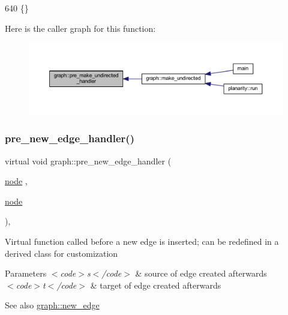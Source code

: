 \begin{DoxyCode}
640 \{\}
\end{DoxyCode}
Here is the caller graph for this function\+:
\nopagebreak
\begin{figure}[H]
\begin{center}
\leavevmode
\includegraphics[width=350pt]{classgraph_a8964107991e6f411ba8992f6b1deda21_icgraph}
\end{center}
\end{figure}
\mbox{\label{classgraph_a0a7a68fa0baa47ef955525c445fa1a04}} 
\subsubsection{\texorpdfstring{pre\+\_\+new\+\_\+edge\+\_\+handler()}{pre\_new\_edge\_handler()}}
{\footnotesize\ttfamily virtual void graph\+::pre\+\_\+new\+\_\+edge\+\_\+handler (\begin{DoxyParamCaption}\item[{\mbox{\hyperlink{classnode}{node}}}]{,  }\item[{\mbox{\hyperlink{classnode}{node}}}]{ }\end{DoxyParamCaption})\hspace{0.3cm}{\ttfamily [inline]}, {\ttfamily [virtual]}}

Virtual function called before a new edge is inserted; can be redefined in a derived class for customization


\begin{DoxyParams}{Parameters}
{\em $<$code$>$s$<$/code$>$} & source of edge created afterwards \\
\hline
{\em $<$code$>$t$<$/code$>$} & target of edge created afterwards \\
\hline
\end{DoxyParams}
\begin{DoxySeeAlso}{See also}
\mbox{\hyperlink{classgraph_a02a0c3a219f75d68caa408ef339d4a1c}{graph\+::new\+\_\+edge}} 
\end{DoxySeeAlso}


